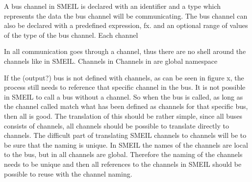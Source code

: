 





A bus channel in SMEIL is declared with an identifier and a type which represents the data the bus channel will be communicating. The bus channel can also be declared with a predefined expression, fx. %
and an optional range of values of the type of the bus channel.
Each channel

In \cspm all communication goes through a channel, thus there are no shell around the channels like in SMEIL.
Channels in \cspm %
Channels in \cspm are global namespace %




If the (output?) bus is not defined with channels, as can be seen in figure x,
the process still needs to reference that specific channel in the bus. It is not possible in SMEIL to call a bus without a channel. So when the bus is called, as long as the channel called match what has been defined as channels for that specific bus, then all is good. The translation of this should be rather simple, since all buses consists of channels, all channels should be possible to translate directly to \cspm channels.
The difficult part of translating SMEIL channels to \cspm channels will be to be sure that the naming is unique. In SMEIL the names of the channels are local to the bus, but in \cspm all channels are global. Therefore the naming of the channels needs to be unique and then all references to the channels in SMEIL should be possible to reuse with the \cspm channel naming.


